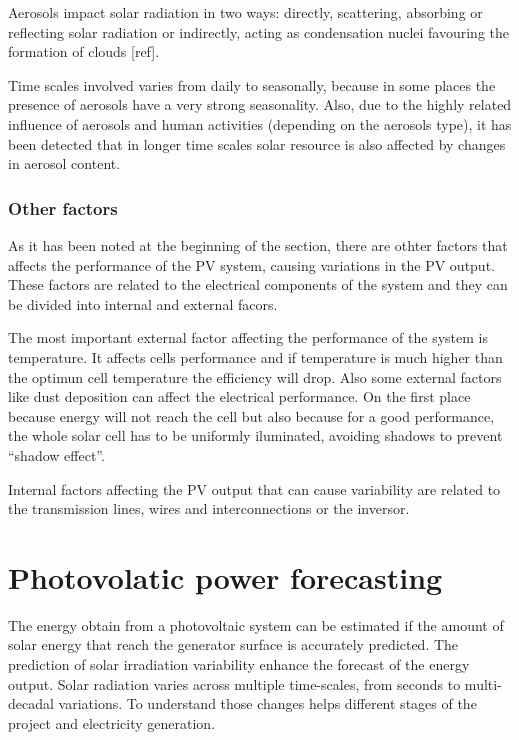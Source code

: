 Aerosols impact solar radiation in two ways: directly, scattering, absorbing or reflecting solar radiation or indirectly, acting as condensation nuclei favouring the formation of clouds [ref].

Time scales involved varies from daily to seasonally, because in some places the presence of aerosols have a very strong seasonality. Also, due to the highly related influence of aerosols and human activities (depending on the aerosols type), it has been detected that in longer time scales solar resource is also affected by changes in aerosol content.


\subsubsection{Other factors}

As it has been noted at the beginning of the section, there are othter factors that affects the performance of the PV system, causing variations in the PV output. These factors are related to the electrical components of the system and they can be divided into internal and external facors.

The most important external factor affecting the performance of the system is temperature. It affects cells performance and if temperature is much higher than the optimun cell temperature the efficiency will drop. Also some external factors like dust deposition can affect the electrical performance. On the first place because energy will not reach the cell but also because for a good performance, the whole solar cell has to be uniformly iluminated, avoiding shadows to prevent ``shadow effect''.

Internal factors affecting the PV output that can cause variability are related to the transmission lines, wires and interconnections or the inversor.

\section{Photovolatic power forecasting}

The energy obtain from a photovoltaic system can be estimated if the amount of solar energy that reach the generator surface is accurately predicted. The prediction of solar irradiation variability enhance the forecast of the energy output. Solar radiation varies across multiple time-scales, from seconds to multi-decadal variations. To understand those changes helps different stages of the project and electricity generation.

